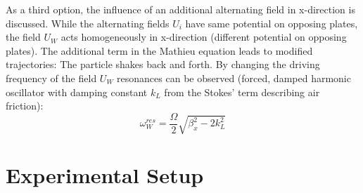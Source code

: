 \documentclass[
	paper=A4,
	parskip=full,
	chapterprefix=true,
	11pt,
	headings=normal,
	bibliography=totoc,
	listof=totoc,
	titlepage=on,
]{scrreprt}
\begin{document}
As a third option, the influence of an additional alternating field in x-direction is discussed. While the alternating fields $U_i$ have same potential on opposing plates, the field $U_W$ acts homogeneously in x-direction (different potential on opposing plates). The additional term in the Mathieu equation leads to modified trajectories: The particle shakes back and forth. By changing the driving frequency of the field $U_W$ resonances can be observed (forced, damped harmonic oscillator with damping constant $k_L$ from the Stokes' term describing air friction):
\begin{equation}
	\omega_W^{res} = \frac{\Omega}{2} \sqrt{\beta_x^2 - 2 k_L^2}
	\label{eq:resonance}
\end{equation}


\chapter{Experimental Setup}
\end{document}
